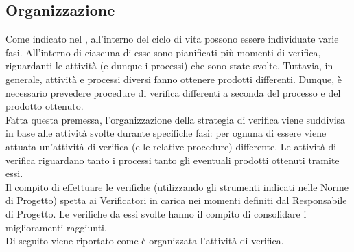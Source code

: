 \subsection{Organizzazione}
	Come indicato nel , all'interno del ciclo di vita possono essere individuate varie fasi. All'interno di ciascuna di 
	esse sono pianificati più momenti di verifica, riguardanti le attività (e dunque i processi) che sono state svolte. Tuttavia, in generale, attività 
	e processi diversi fanno ottenere prodotti differenti. Dunque, è necessario prevedere procedure di verifica differenti a seconda del processo e del 
	prodotto ottenuto.\\
	Fatta questa premessa, l'organizzazione della strategia di verifica viene suddivisa in base alle attività svolte durante specifiche fasi: per ognuna 
	di essere viene attuata un'attività di verifica (e le relative procedure) differente. Le attività di verifica riguardano tanto i processi tanto gli 
	eventuali prodotti ottenuti tramite essi.\\
	Il compito di effettuare le verifiche (utilizzando gli strumenti indicati nelle Norme di Progetto) spetta ai Verificatori in carica nei momenti 
	definiti dal Responsabile di Progetto. Le verifiche da essi svolte hanno il compito di consolidare i miglioramenti raggiunti.\\
	Di seguito viene riportato come è organizzata l'attività di verifica.
